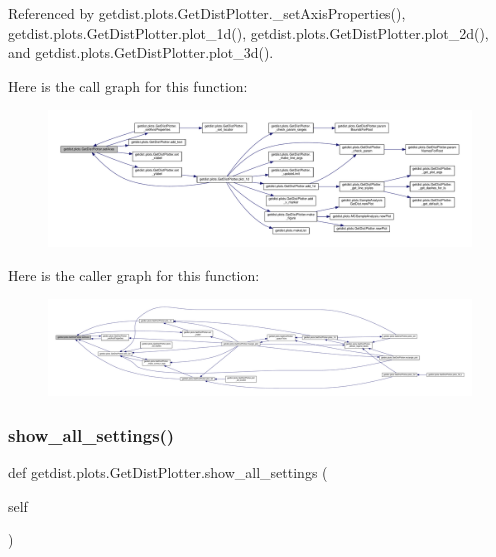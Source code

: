 Referenced by getdist.\+plots.\+Get\+Dist\+Plotter.\+\_\+set\+Axis\+Properties(), getdist.\+plots.\+Get\+Dist\+Plotter.\+plot\+\_\+1d(), getdist.\+plots.\+Get\+Dist\+Plotter.\+plot\+\_\+2d(), and getdist.\+plots.\+Get\+Dist\+Plotter.\+plot\+\_\+3d().

Here is the call graph for this function\+:
\nopagebreak
\begin{figure}[H]
\begin{center}
\leavevmode
\includegraphics[width=350pt]{classgetdist_1_1plots_1_1GetDistPlotter_afc478614168ba111f0ec1bba56bdb692_cgraph}
\end{center}
\end{figure}
Here is the caller graph for this function\+:
\nopagebreak
\begin{figure}[H]
\begin{center}
\leavevmode
\includegraphics[width=350pt]{classgetdist_1_1plots_1_1GetDistPlotter_afc478614168ba111f0ec1bba56bdb692_icgraph}
\end{center}
\end{figure}
\mbox{\label{classgetdist_1_1plots_1_1GetDistPlotter_af4832303ee4e0106314557a329153201}} 
\subsubsection{\texorpdfstring{show\+\_\+all\+\_\+settings()}{show\_all\_settings()}}
{\footnotesize\ttfamily def getdist.\+plots.\+Get\+Dist\+Plotter.\+show\+\_\+all\+\_\+settings (\begin{DoxyParamCaption}\item[{}]{self }\end{DoxyParamCaption})}


